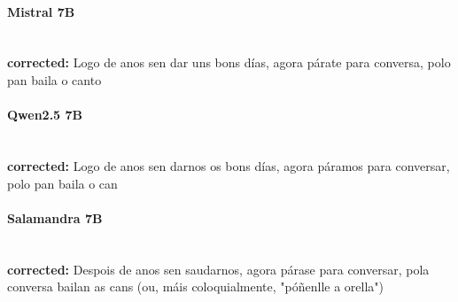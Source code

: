 \paragraph{Mistral 7B}~\\
\textbf{corrected:} Logo de anos sen dar uns bons días, agora párate para conversa, polo pan baila o canto

\paragraph{Qwen2.5 7B}~\\
\textbf{corrected:} Logo de anos sen darnos os bons días, agora páramos para conversar, polo pan baila o can

\paragraph{Salamandra 7B}~\\
\textbf{corrected:} Despois de anos sen saudarnos, agora párase para conversar, pola conversa bailan as cans (ou, máis coloquialmente, "póñenlle a orella")